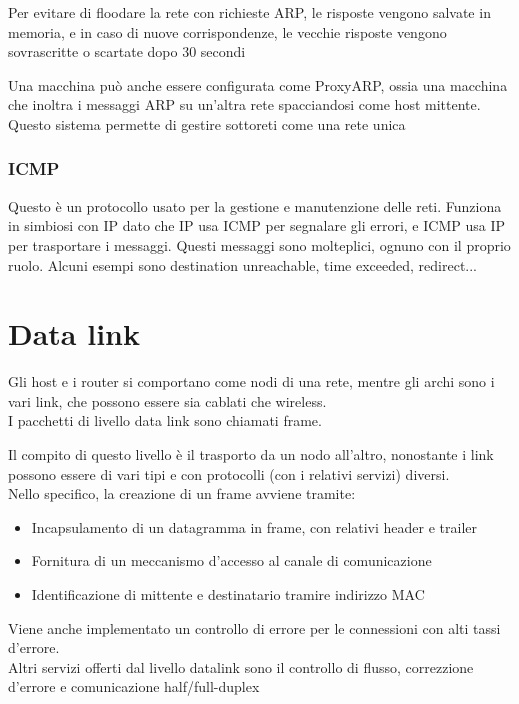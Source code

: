 \documentclass[12pt, a4paper]{article}
\begin{document}
Per evitare di floodare la rete con richieste ARP, le risposte vengono salvate in memoria, e in caso di nuove 
corrispondenze, le vecchie risposte vengono sovrascritte o scartate dopo 30 secondi

Una macchina può anche essere configurata come ProxyARP, ossia una macchina che inoltra i messaggi ARP 
su un'altra rete spacciandosi come host mittente. Questo sistema permette di gestire sottoreti come una rete 
unica

\subsubsection{ICMP}
Questo è un protocollo usato per la gestione e manutenzione delle reti. Funziona in simbiosi con IP dato che 
IP usa ICMP per segnalare gli errori, e ICMP usa IP per trasportare i messaggi.
Questi messaggi sono molteplici, ognuno con il proprio ruolo. Alcuni esempi sono destination unreachable, time
exceeded, redirect...


\newpage
\section{Data link}
Gli host e i router si comportano come nodi di una rete, mentre gli archi sono i vari link, che possono 
essere sia cablati che wireless. \\I pacchetti di livello data link sono chiamati frame. 

Il compito di questo livello è il trasporto da un nodo all'altro, nonostante i link possono essere di 
vari tipi e con protocolli (con i relativi servizi) diversi. \\Nello specifico, la creazione di un 
frame avviene tramite:
\begin{itemize}
    \item Incapsulamento di un datagramma in frame, con relativi header e trailer
    \item Fornitura di un meccanismo d'accesso al canale di comunicazione
    \item Identificazione di mittente e destinatario tramire indirizzo MAC 
\end{itemize}
Viene anche implementato un controllo di errore per le connessioni con alti tassi d'errore.\\ Altri
servizi offerti dal livello datalink sono il controllo di flusso, correzzione d'errore e comunicazione
half/full-duplex
\end{document}
